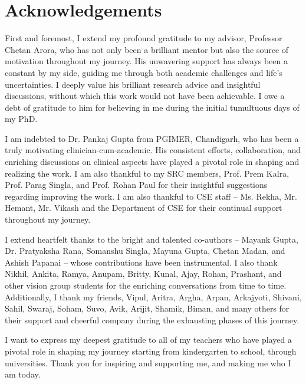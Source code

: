 \onehalfspacing
{}
\chapter*{Acknowledgements}
\setlength{\parindent}{0pt} 
\setlength{\parskip}{1ex}

First and foremost, I extend my profound gratitude to my advisor, Professor Chetan Arora, who has not only been a brilliant mentor but also the source of motivation throughout my journey. His unwavering support has always been a constant by my side, guiding me through both academic challenges and life's uncertainties. I deeply value his brilliant research advice and insightful discussions, without which this work would not have been achievable. I owe a debt of gratitude to him for believing in me during the initial tumultuous days of my PhD.

I am indebted to Dr. Pankaj Gupta from PGIMER, Chandigarh, who has been a truly motivating clinician-cum-academic. His consistent efforts, collaboration, and enriching discussions on clinical aspects have played a pivotal role in shaping and realizing the work. I am also thankful to my SRC members, Prof. Prem Kalra, Prof. Parag Singla, and Prof. Rohan Paul for their insightful suggestions regarding improving the work. I am also thankful to CSE staff -- Ms. Rekha, Mr. Hemant, Mr. Vikash and the Department of CSE for their continual support throughout my journey. 

I extend heartfelt thanks to the bright and talented co-authors -- Mayank Gupta, Dr. Pratyaksha Rana, Somanshu Singla, Mayuna Gupta, Chetan Madan, and Ashish Papanai -- whose contributions have been instrumental. I also thank Nikhil, Ankita, Ramya, Anupam, Britty, Kunal, Ajay, Rohan, Prashant, and other vision group students for the enriching conversations from time to time. Additionally, I thank my friends, Vipul, Aritra, Argha, Arpan, Arkajyoti, Shivani, Sahil, Swaraj, Soham, Suvo, Avik, Arijit, Shamik, Biman, and many others for their support and cheerful company during the exhausting phases of this journey. 

I want to express my deepest gratitude to all of my teachers who have played a pivotal role in shaping my journey starting from kindergarten to school, through universities. Thank you for inspiring and supporting me, and making me who I am today.

